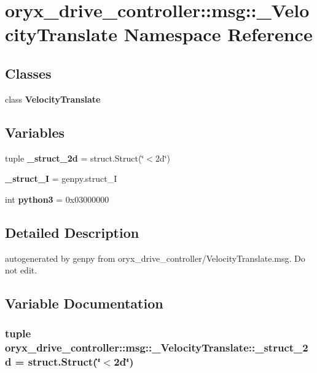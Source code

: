 \section{oryx\-\_\-drive\-\_\-controller\-:\-:msg\-:\-:\-\_\-\-Velocity\-Translate \-Namespace \-Reference}
\label{namespaceoryx__drive__controller_1_1msg_1_1__VelocityTranslate}
\subsection*{\-Classes}
\begin{DoxyCompactItemize}
\item 
class {\bf \-Velocity\-Translate}
\end{DoxyCompactItemize}
\subsection*{\-Variables}
\begin{DoxyCompactItemize}
\item 
tuple {\bf \-\_\-struct\-\_\-2d} = struct.\-Struct(\char`\"{}$<$2d\char`\"{})
\item 
{\bf \-\_\-struct\-\_\-\-I} = genpy.\-struct\-\_\-\-I
\item 
int {\bf python3} = 0x03000000
\end{DoxyCompactItemize}


\subsection{\-Detailed \-Description}
\begin{DoxyVerb}autogenerated by genpy from oryx_drive_controller/VelocityTranslate.msg. Do not edit.\end{DoxyVerb}
 

\subsection{\-Variable \-Documentation}
\subsubsection[{\-\_\-struct\-\_\-2d}]{\setlength{\rightskip}{0pt plus 5cm}tuple {\bf oryx\-\_\-drive\-\_\-controller\-::msg\-::\-\_\-\-Velocity\-Translate\-::\-\_\-struct\-\_\-2d} = struct.\-Struct(\char`\"{}$<$2d\char`\"{})}\label{namespaceoryx__drive__controller_1_1msg_1_1__VelocityTranslate_a7d3d09fe4c13be1976cb667e2d2a5cc3}



